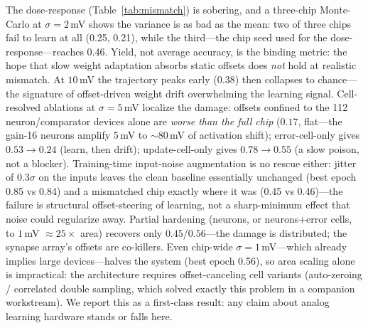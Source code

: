 \documentclass[11pt]{article}
\begin{document}
The dose-response (Table~\ref{tab:mismatch}) is sobering, and a three-chip Monte-Carlo at $\sigma{=}2$\,mV shows the variance is as bad as the mean: two of three chips fail to learn at all (0.25, 0.21), while the third---the chip seed used for the dose-response---reaches 0.46. Yield, not average accuracy, is the binding metric: the hope that slow weight adaptation absorbs static offsets does \emph{not} hold at realistic mismatch. At $10$\,mV the trajectory peaks early ($0.38$) then collapses to chance---the signature of offset-driven weight drift overwhelming the learning signal. Cell-resolved ablations at $\sigma{=}5$\,mV localize the damage: offsets confined to the 112 neuron/comparator devices alone are \emph{worse than the full chip} ($0.17$, flat---the gain-16 neurons amplify $5$\,mV to ${\sim}80$\,mV of activation shift); error-cell-only gives $0.53\!\to\!0.24$ (learn, then drift); update-cell-only gives $0.78\!\to\!0.55$ (a slow poison, not a blocker). Training-time input-noise augmentation is no rescue either: jitter of $0.3\sigma$ on the inputs leaves the clean baseline essentially unchanged (best epoch 0.85 vs 0.84) and a mismatched chip exactly where it was (0.45 vs 0.46)---the failure is structural offset-steering of learning, not a sharp-minimum effect that noise could regularize away. Partial hardening (neurons, or neurons+error cells, to $1$\,mV $\approx 25\times$ area) recovers only $0.45$/$0.56$---the damage is distributed; the synapse array's offsets are co-killers. Even chip-wide $\sigma=1$\,mV---which already implies large devices---halves the system (best epoch 0.56), so area scaling alone is impractical: the architecture requires offset-canceling cell variants (auto-zeroing / correlated double sampling, which solved exactly this problem in a companion workstream). We report this as a first-class result: any claim about analog learning hardware stands or falls here.
\end{document}
